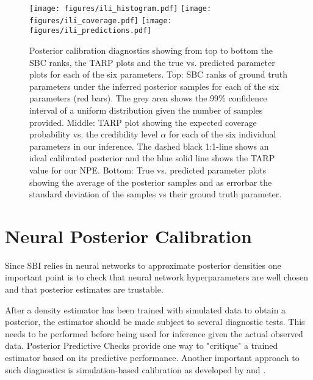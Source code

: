 \documentclass{aa}
\begin{document}
\begin{appendix}
\begin{figure*}[]
     \centering
     \texttt{[image: figures/ili\_histogram.pdf]}
     \texttt{[image: figures/ili\_coverage.pdf]}
     \texttt{[image: figures/ili\_predictions.pdf]}
     \caption{Posterior calibration diagnostics showing from top to bottom the SBC ranks, the TARP plots and the true vs. predicted parameter plots for each of the six parameters.
     Top: SBC ranks of ground truth parameters under the inferred posterior samples for each of the six parameters (red bars). The grey area shows the 99\% confidence interval of a uniform distribution given the number of samples provided. Middle: TARP plot showing the expected coverage probability vs. the credibility level $\alpha$ for each of the six individual parameters in our inference. The dashed black 1:1-line shows an ideal calibrated posterior and the blue solid line shows the TARP value for our NPE. Bottom: True vs. predicted parameter plots showing the average of the posterior samples and as errorbar the standard deviation of the samples vs their ground truth parameter.}
     \label{fig:tarp}
\end{figure*}

\section{Neural Posterior Calibration}
\label{sec:sbc}

Since SBI relies in neural networks to approximate posterior densities one important point is to check that neural network hyperparameters are well chosen and that posterior estimates are trustable.

After a density estimator has been trained with simulated data to obtain a posterior, the estimator should be made subject to several diagnostic tests. This needs to be performed before being used for inference given the actual observed data. Posterior Predictive Checks provide one way to "critique" a trained estimator based on its predictive performance. Another important approach to such diagnostics is simulation-based calibration as developed by \citet{Cook2006} and \citet{Talts2018}. 


\end{appendix}
\end{document}

